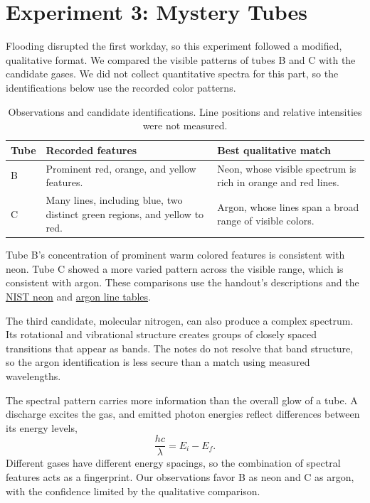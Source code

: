 \section{Experiment 3: Mystery Tubes}

Flooding disrupted the first workday, so this experiment followed a modified, qualitative format. We compared the visible patterns of tubes B and C with the candidate gases. We did not collect quantitative spectra for this part, so the identifications below use the recorded color patterns.

\begin{table}[H]
\centering
\begin{tabular}{>{\raggedright\arraybackslash}p{.08\linewidth}>{\raggedright\arraybackslash}p{.43\linewidth}>{\raggedright\arraybackslash}p{.36\linewidth}}
\toprule
Tube & Recorded features & Best qualitative match \\
\midrule
B & Prominent red, orange, and yellow features. & Neon, whose visible spectrum is rich in orange and red lines. \\
C & Many lines, including blue, two distinct green regions, and yellow to red. & Argon, whose lines span a broad range of visible colors. \\
\bottomrule
\end{tabular}
\caption{Observations and candidate identifications. Line positions and relative intensities were not measured.}
\end{table}

Tube B's concentration of prominent warm colored features is consistent with neon. Tube C showed a more varied pattern across the visible range, which is consistent with argon. These comparisons use the handout's descriptions and the \href{https://physics.nist.gov/PhysRefData/Handbook/Tables/neontable2.htm}{NIST neon} and \href{https://physics.nist.gov/PhysRefData/Handbook/Tables/argontable2.htm}{argon line tables}.

The third candidate, molecular nitrogen, can also produce a complex spectrum. Its rotational and vibrational structure creates groups of closely spaced transitions that appear as bands. The notes do not resolve that band structure, so the argon identification is less secure than a match using measured wavelengths.

The spectral pattern carries more information than the overall glow of a tube. A discharge excites the gas, and emitted photon energies reflect differences between its energy levels,
\begin{equation}
\frac{hc}{\lambda}=E_i-E_f.
\end{equation}
Different gases have different energy spacings, so the combination of spectral features acts as a fingerprint. Our observations favor B as neon and C as argon, with the confidence limited by the qualitative comparison.
